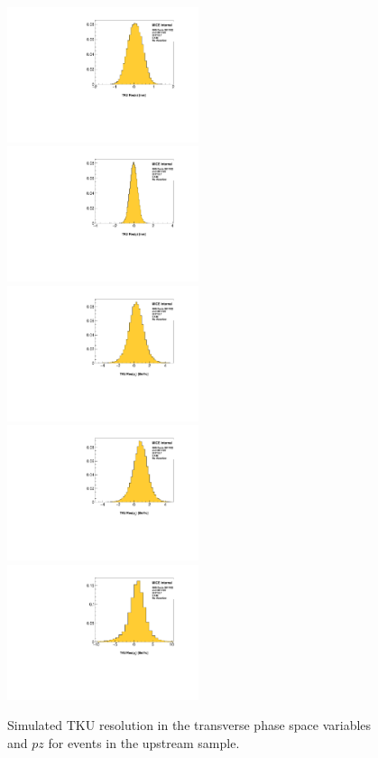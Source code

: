 \begin{figure}[!tbh]
    \includegraphics[width=0.5\textwidth]{03-Detectors/Figures/compare_mc/2017-2.7_6-140_None/tku_x}
    \includegraphics[width=0.5\textwidth]{03-Detectors/Figures/compare_mc/2017-2.7_6-140_None/tku_y}
    \includegraphics[width=0.5\textwidth]{03-Detectors/Figures/compare_mc/2017-2.7_6-140_None/tku_px}
    \includegraphics[width=0.5\textwidth]{03-Detectors/Figures/compare_mc/2017-2.7_6-140_None/tku_py}
    \includegraphics[width=0.5\textwidth]{03-Detectors/Figures/compare_mc/2017-2.7_6-140_None/tku_pz}
    \caption{Simulated TKU resolution in the transverse phase space variables and $pz$ for events in the upstream sample. \label{fig:tku_resolution}}
\end{figure}


